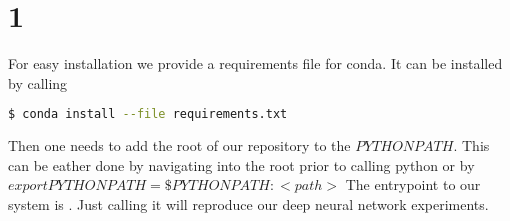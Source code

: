 \section{1}
For easy installation we provide a requirements file for conda. It can be installed by calling
\begin{lstlisting}[language=bash]
    $ conda install --file requirements.txt 
\end{lstlisting}
Then one needs to add the root of our repository to the $PYTHONPATH$. This can be eather done by navigating into the root prior to calling python or by $export PYTHONPATH=\$PYTHONPATH:<path>$
The entrypoint to our system is . Just calling it will reproduce our deep neural network experiments.
